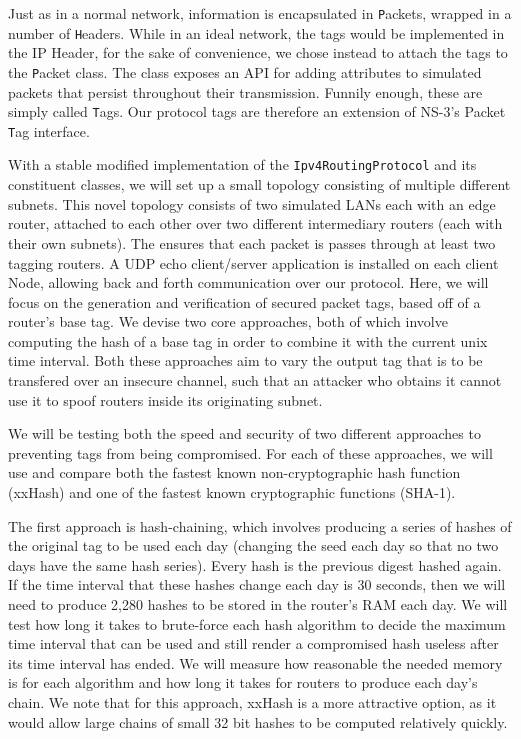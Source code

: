 \documentclass[12pt]{article} %
\newcommand{\prettycode}[1]
{\lstinline[basicstyle=\ttfamily]{#1}}
\begin{document}
Just as in a normal network, information is encapsulated in {\prettycode Packets}, wrapped in a number of {\prettycode Headers}. While in an ideal network, the tags would be implemented in the IP Header, for the sake of convenience, we chose instead to attach the tags to the {\prettycode Packet} class. The class exposes an API for adding attributes to simulated packets that persist throughout their transmission. Funnily enough, these are simply called {\prettycode Tags}. Our protocol tags are therefore an extension of NS-3's Packet {\prettycode Tag} interface.

With a stable modified implementation of the \prettycode{Ipv4RoutingProtocol} and its constituent classes, we will set up a small topology consisting of multiple different subnets. This novel topology consists of two simulated LANs each with an edge router, attached to each other over two different intermediary routers (each with their own subnets). The ensures that each packet is passes through at least two tagging routers. A UDP echo client/server application is installed on each client Node, allowing back and forth communication over our protocol. Here, we will focus on the generation and verification of secured packet tags, based off of a router's base tag. We devise two core approaches, both of which involve computing the hash of a base tag in order to combine it with the current unix time interval. Both these approaches aim to vary the output tag that is to be transfered over an insecure channel, such that an attacker who obtains it cannot use it to spoof routers inside its originating subnet.

We will be testing both the speed and security of two different approaches to preventing tags from being compromised. For each of these approaches, we will use and compare both the fastest known non-cryptographic hash function (xxHash\cite{xxhash}) and one of the fastest known cryptographic functions (SHA-1). 

The first approach is hash-chaining, which involves producing a series of hashes of the original tag to be used each day (changing the seed each day so that no two days have the same hash series). Every hash is the previous digest hashed again. If the time interval that these hashes change each day is 30 seconds, then we will need to produce 2,280 hashes to be stored in the router's RAM each day. We will test how long it takes to brute-force each hash algorithm to decide the maximum time interval that can be used and still render a compromised hash useless after its time interval has ended. We will measure how reasonable the needed memory is for each algorithm and how long it takes for routers to produce each day's chain. We note that for this approach, xxHash is a more attractive option, as it would allow large chains of small 32 bit hashes to be computed relatively quickly.
\end{document}
